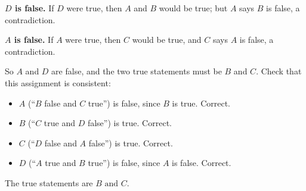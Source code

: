 \textbf{$D$ is false.} If $D$ were true, then $A$ and $B$ would be true; but $A$ says $B$ is false, a contradiction.

\textbf{$A$ is false.} If $A$ were true, then $C$ would be true, and $C$ says $A$ is false, a contradiction.

So $A$ and $D$ are false, and the two true statements must be $B$ and $C$. Check that this assignment is consistent:
\begin{itemize}
\item $A$ (``$B$ false and $C$ true'') is false, since $B$ is true. Correct.
\item $B$ (``$C$ true and $D$ false'') is true. Correct.
\item $C$ (``$D$ false and $A$ false'') is true. Correct.
\item $D$ (``$A$ true and $B$ true'') is false, since $A$ is false. Correct.
\end{itemize}
The true statements are $\boxed{B\text{ and }C}$.
